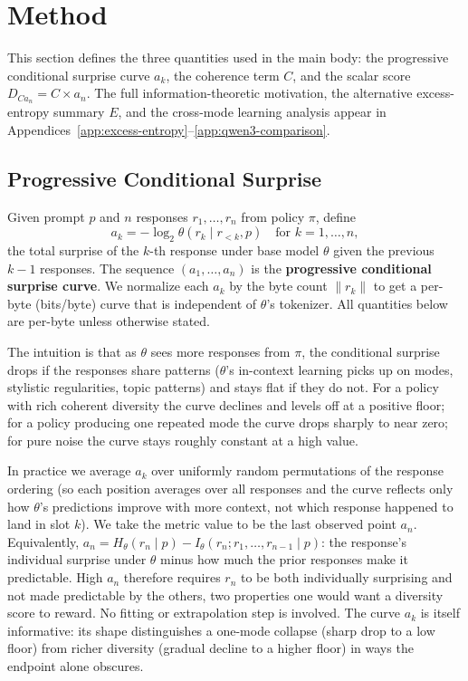 \section{Method}\label{sec:method}

This section defines the three quantities used in the main body: the progressive conditional surprise curve $a_k$, the coherence term $C$, and the scalar score $D_{Ca_n} = C \times a_n$.
The full information-theoretic motivation, the alternative excess-entropy summary $E$, and the cross-mode learning analysis appear in Appendices~\ref{app:excess-entropy}--\ref{app:qwen3-comparison}.

\subsection{Progressive Conditional Surprise}\label{sec:progressive-conditioning}

Given prompt $p$ and $n$ responses $r_1, \ldots, r_n$ from policy $\pi$, define
\begin{equation}\label{eq:ak}
    a_k = -\log_2 \theta(r_k \mid r_{<k}, p) \quad \text{for } k = 1, \ldots, n,
\end{equation}
the total surprise of the $k$-th response under base model $\theta$ given the previous $k{-}1$ responses.
The sequence $(a_1, \ldots, a_n)$ is the \textbf{progressive conditional surprise curve}.
We normalize each $a_k$ by the byte count $\|r_k\|$ to get a per-byte (bits/byte) curve that is independent of $\theta$'s tokenizer.
All quantities below are per-byte unless otherwise stated.

The intuition is that as $\theta$ sees more responses from $\pi$, the conditional surprise drops if the responses share patterns ($\theta$'s in-context learning picks up on modes, stylistic regularities, topic patterns) and stays flat if they do not.
For a policy with rich coherent diversity the curve declines and levels off at a positive floor; for a policy producing one repeated mode the curve drops sharply to near zero; for pure noise the curve stays roughly constant at a high value.

In practice we average $a_k$ over uniformly random permutations of the response ordering (so each position averages over all responses and the curve reflects only how $\theta$'s predictions improve with more context, not which response happened to land in slot $k$).
We take the metric value to be the last observed point $a_n$.
Equivalently, $a_n = H_\theta(r_n \mid p) - I_\theta(r_n; r_1, \ldots, r_{n-1} \mid p)$: the response's individual surprise under $\theta$ minus how much the prior responses make it predictable.
High $a_n$ therefore requires $r_n$ to be both individually surprising and not made predictable by the others, two properties one would want a diversity score to reward.
No fitting or extrapolation step is involved.
The curve $a_k$ is itself informative: its shape distinguishes a one-mode collapse (sharp drop to a low floor) from richer diversity (gradual decline to a higher floor) in ways the endpoint alone obscures.

